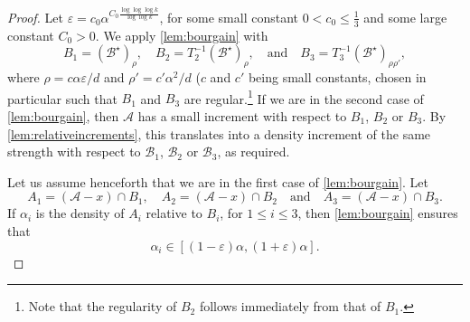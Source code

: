 \documentclass{daj}
\theoremstyle{definition}
\newcommand{\eps}{\varepsilon}
\newcommand{\A}{\ensuremath{\mathcal{A}}}
\newcommand{\B}{\ensuremath{\mathcal{B}}}
\begin{document}
\begin{proof}[Proof]
Let $\eps = c_0 \alpha^{C_0 \frac{\log\log \log k}{\log \log k}}$, for some small constant $0< c_0 \leq \frac13$ and some large constant $C_0 > 0$. We apply \cref{lem:bourgain} with
\begin{equation*}
B_1 = (\B^{\star})_{\rho}, \quad B_2 = T_2^{-1}(\B^{\star})_{\rho},\quad \text{and}\quad B_3 = T_3^{-1}(\B^{\star})_{\rho\rho'},
\end{equation*}
where $\rho = c\alpha\eps/d$ and $\rho' = c'\alpha^2/d$ ($c$ and $c'$ being small constants, chosen in particular such that $B_1$ and $B_3$ are regular.\footnote{Note that the regularity of $B_2$ follows immediately from that of $B_1$.} If we are in the second case of \cref{lem:bourgain}, then $\A$ has a small increment with respect to $B_1$, $B_2$ or $B_3$. By \cref{lem:relativeincrements}, this translates into a density increment of the same strength with respect to $\B_1$, $\B_2$ or $\B_3$, as required. 

Let us assume henceforth that we are in the first case of \cref{lem:bourgain}. Let
\begin{equation*}
A_1 = (\A - x) \cap B_1, \quad A_2 = (\A - x) \cap B_2\quad \text{and}\quad A_3 = (\A - x) \cap B_3.
\end{equation*}
If $\alpha_i$ is the density of $A_i$ relative to $B_i$, for $1\leq i\leq 3$, then \cref{lem:bourgain} ensures that 
\begin{equation*}
\alpha_i \in [(1-\eps)\alpha, (1+\eps)\alpha].
\end{equation*}


\end{proof}
\end{document}
